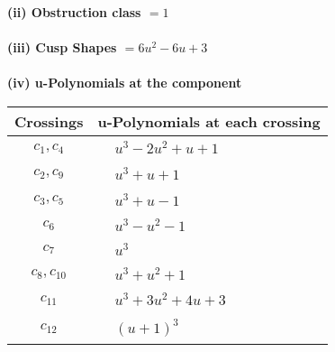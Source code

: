 \documentclass[1p]{elsarticle_modified}
\theoremstyle{definition}
\begin{document}
\flushleft \textbf{(ii) Obstruction class $= 1$}\\~\\
\flushleft \textbf{(iii) Cusp Shapes $= 6 u^2-6 u+3$}\\~\\
\newpage\renewcommand{\arraystretch}{1}
\flushleft \textbf{(iv) u-Polynomials at the component}\newline \\
\begin{tabular}{m{50pt}|m{274pt}}
Crossings & \hspace{64pt}u-Polynomials at each crossing \\
\hline $$\begin{aligned}c_{1},c_{4}\end{aligned}$$&$\begin{aligned}
&u^3-2 u^2+u+1
\end{aligned}$\\
\hline $$\begin{aligned}c_{2},c_{9}\end{aligned}$$&$\begin{aligned}
&u^3+u+1
\end{aligned}$\\
\hline $$\begin{aligned}c_{3},c_{5}\end{aligned}$$&$\begin{aligned}
&u^3+u-1
\end{aligned}$\\
\hline $$\begin{aligned}c_{6}\end{aligned}$$&$\begin{aligned}
&u^3- u^2-1
\end{aligned}$\\
\hline $$\begin{aligned}c_{7}\end{aligned}$$&$\begin{aligned}
&u^3
\end{aligned}$\\
\hline $$\begin{aligned}c_{8},c_{10}\end{aligned}$$&$\begin{aligned}
&u^3+u^2+1
\end{aligned}$\\
\hline $$\begin{aligned}c_{11}\end{aligned}$$&$\begin{aligned}
&u^3+3 u^2+4 u+3
\end{aligned}$\\
\hline $$\begin{aligned}c_{12}\end{aligned}$$&$\begin{aligned}
&(u+1)^3
\end{aligned}$\\
\hline
\end{tabular}\\~\\
\end{document}
